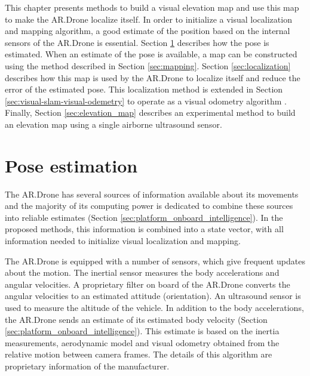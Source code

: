 This chapter presents methods to build a visual elevation map and use this map to make the AR.Drone localize itself.
In order to initialize a visual localization and mapping algorithm, a good estimate of the position based on the internal sensors of the AR.Drone is essential.
Section \ref{sec:pose_estimation} describes how the pose is estimated.
When an estimate of the pose is available, a map can be constructed using the method described in Section \ref{sec:mapping}.
Section \ref{sec:localization} describes how this map is used by the AR.Drone to localize itself and reduce the error of the estimated pose.
This localization method is extended in Section \ref{sec:visual-slam-visual-odemetry} to operate as a visual odometry algorithm .
Finally, Section \ref{sec:elevation_map} describes an experimental method to build an elevation map using a single airborne ultrasound sensor.

	\section{Pose estimation}
	\label{sec:pose_estimation}
The AR.Drone has several sources of information available about its movements and the majority of its computing power is dedicated to combine these sources into reliable estimates (Section \ref{sec:platform_onboard_intelligence}). In the proposed methods, this information is combined into a state vector, with all information needed to initialize visual localization and mapping.

The AR.Drone is equipped with a number of sensors, which give frequent updates about the motion. 
The inertial sensor measures the body accelerations and angular velocities.
A proprietary filter on board of the AR.Drone converts the angular velocities to an estimated attitude (orientation).
An ultrasound sensor is used to measure the altitude of the vehicle.
In addition to the body accelerations, the AR.Drone sends an estimate of its estimated body velocity (Section \ref{sec:platform_onboard_intelligence}).
This estimate is based on the inertia measurements, aerodynamic model and visual odometry obtained from the relative motion between camera frames.
The details of this algorithm are proprietary information of the manufacturer. 

